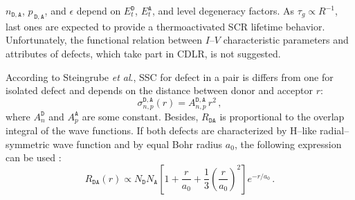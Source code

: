 \documentclass[aip,jap, amsmath,amssymb,reprint]{revtex4-1}
\begin{document}
$n_{\mathtt{D,A}}$, $p_{\,\mathtt{D,A}}$, and $\epsilon$ depend on $E_t^{\mathtt{D}}$, $E_t^{\mathtt{A}}$, and level degeneracy  factors.
As $\tau_g\propto R^{-1}$, last ones are expected to provide a thermoactivated SCR lifetime behavior.
Unfortunately, the functional relation between $I$--$V$ characteristic parameters and attributes of defects, which take part in CDLR, is not suggested.

According to Steingrube \emph{et al}.\cite{CDLR:JAP},
SSC for defect in a pair is differs from one for isolated defect and depends on the distance between donor and acceptor $r$:
\begin{equation}
\label{eqSigma}
\sigma_{n,p}^{\mathtt{D,A}}(r)=A_{n,p}^{\mathtt{D,A}}\,r^2\,,
\end{equation}
where $A_{n}^{\mathtt{D}}$ and $A_{p}^{\mathtt{A}}$ are some constant.
Besides, $R_{\mathtt{DA}}$ is proportional to the overlap integral of the wave functions.
If both defects are characterized by H--like radial--symmetric wave function and by equal Bohr radius $a_0$,
the following expression can be used \cite{CDLR:JAP}:
\begin{equation}
\label{eqRda}
R_{\mathtt{DA}} (r) \propto N_{\mathtt{D}}N_{\mathtt{A}}\left[1+\frac{r}{a_0}+\frac{1}{3}\left(\frac{r}{a_0}\right)^2\right]
   e^{-r/a_0}\,.
\end{equation}


\end{document}
